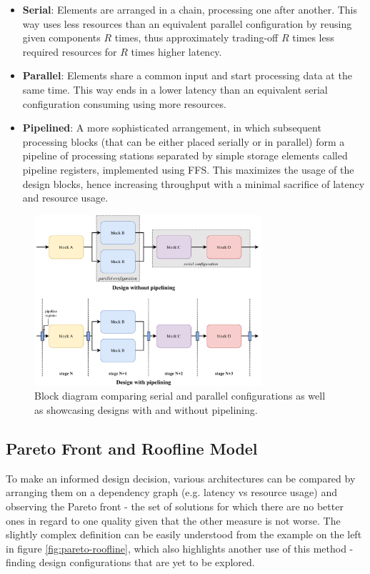 \begin{itemize}
  \item \textbf{Serial}: Elements are arranged in a chain, processing one after another. This way uses less resources than an equivalent parallel configuration by reusing given components \(R\) times, thus approximately trading-off \(R\) times less required resources for \(R\) times higher latency.
  \item \textbf{Parallel}: Elements share a common input and start processing data at the same time. This way ends in a lower latency than an equivalent serial configuration consuming using more resources.
  \item \textbf{Pipelined}: A more sophisticated arrangement, in which subsequent processing blocks (that can be either placed serially or in parallel) form a pipeline of processing stations separated by simple storage elements called pipeline registers, implemented using FFS. This maximizes the usage of the design blocks, hence increasing throughput with a minimal sacrifice of latency and resource usage.
\end{itemize}

\begin{figure}[hpt!]
  \centering
  \includegraphics[trim={0cm 0cm 0cm 0cm}, width=0.75\textwidth, center]{background/serial_parallel_pipelined.pdf}
  \caption{Block diagram comparing serial and parallel configurations as well as showcasing designs with and without pipelining.}
  \label{fig:serial-parallel-pipelined}
\end{figure}

\subsection{Pareto Front and Roofline Model}
To make an informed design decision, various architectures can be compared by arranging them on a dependency graph (e.g. latency vs resource usage) and observing the Pareto front - the set of solutions for which there are no better ones in regard to one quality given that the other measure is not worse. The slightly complex definition can be easily understood from the example on the left in figure \ref{fig:pareto-roofline}, which also highlights another use of this method - finding design configurations that are yet to be explored.

